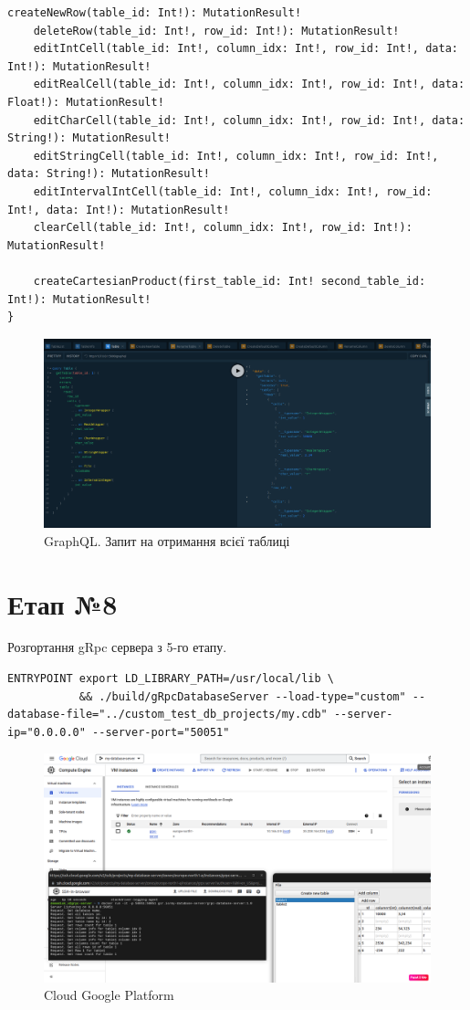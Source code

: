 \documentclass[a4paper, 12pt]{article}
\begin{document}
\begin{lstlisting}[caption=GraphQL schema]
    createNewRow(table_id: Int!): MutationResult!
    deleteRow(table_id: Int!, row_id: Int!): MutationResult!
    editIntCell(table_id: Int!, column_idx: Int!, row_id: Int!, data: Int!): MutationResult!
    editRealCell(table_id: Int!, column_idx: Int!, row_id: Int!, data: Float!): MutationResult!
    editCharCell(table_id: Int!, column_idx: Int!, row_id: Int!, data: String!): MutationResult!
    editStringCell(table_id: Int!, column_idx: Int!, row_id: Int!, data: String!): MutationResult!
    editIntervalIntCell(table_id: Int!, column_idx: Int!, row_id: Int!, data: Int!): MutationResult!
    clearCell(table_id: Int!, column_idx: Int!, row_id: Int!): MutationResult!

    createCartesianProduct(first_table_id: Int! second_table_id: Int!): MutationResult!
}
\end{lstlisting}

\begin{figure}[H]
\centering
\includegraphics[scale=0.32]{resources/GraphQLTableQuery.png}
\caption{GraphQL. Запит на отримання всієї таблиці}
\end{figure}

\section{Етап №8}

Розгортання gRpc сервера з 5-го етапу.

\begin{lstlisting}[caption=фрагмент Dockerfile для деплою сервера]
ENTRYPOINT export LD_LIBRARY_PATH=/usr/local/lib \
           && ./build/gRpcDatabaseServer --load-type="custom" --database-file="../custom_test_db_projects/my.cdb" --server-ip="0.0.0.0" --server-port="50051"
\end{lstlisting}

\begin{figure}[H]
\centering
\includegraphics[scale=0.32]{resources/Cloud.png}
\caption{Cloud Google Platform}
\end{figure}
\end{document}
